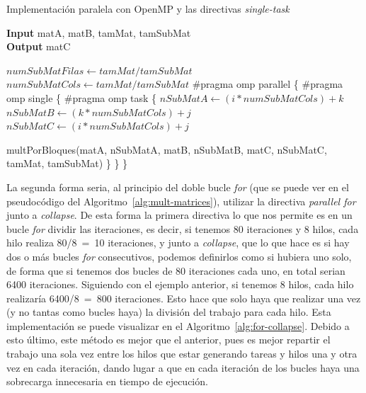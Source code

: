 \documentclass[a4paper,12pt]{article}
\begin{document}
\begin{algorithm} [htbp]
	\caption{Implementación paralela con OpenMP y las directivas {\it single-task}}
    \hspace*{\algorithmicindent} \textbf{Input} matA, matB, tamMat, tamSubMat\\
    \hspace*{\algorithmicindent} \textbf{Output} matC
	\begin{algorithmic}[1]
	    \State $numSubMatFilas \leftarrow tamMat/tamSubMat$
		\State $numSubMatCols \leftarrow tamMat/tamSubMat$
		\State \#pragma omp parallel
		\State \{
		\State \#pragma omp single
        \State \{
	        \State \#pragma omp task 
            \State \{
				\State $nSubMatA \leftarrow (i * numSubMatCols) + k$ 
				\State $nSubMatB \leftarrow  (k * numSubMatCols) + j$
				\State $nSubMatC \leftarrow  (i * numSubMatCols) + j$
				
				\State multPorBloques(matA, nSubMatA, matB, nSubMatB, matC, nSubMatC, tamMat, tamSubMat)
            \EndFor
	        \State \}
        \EndFor
		\EndFor
		\State \}
		\State \}
	\end{algorithmic}
	\label{alg:single-task}
\end{algorithm}

La segunda forma seria, al principio del doble bucle {\it for} (que se puede ver en el pseudocódigo del Algoritmo~\ref{alg:mult-matrices}), utilizar la directiva {\it parallel for} junto a {\it collapse}. De esta forma la primera directiva lo que nos permite es en un bucle {\it for} dividir las iteraciones, es decir, si tenemos 80 iteraciones y 8 hilos, cada hilo realiza 80/8~=~10 iteraciones, y junto a {\it collapse}, que lo que hace es si hay dos o más bucles {\it for} consecutivos, podemos definirlos como si hubiera uno solo, de forma que si tenemos dos bucles de 80 iteraciones cada uno, en total serian 6400 iteraciones. Siguiendo con el ejemplo anterior, si tenemos 8 hilos, cada hilo realizaría 6400/8~=~800 iteraciones. Esto hace que solo haya que realizar una vez (y no tantas como bucles haya) la división del trabajo para cada hilo. Esta implementación se puede visualizar en el  Algoritmo~\ref{alg:for-collapse}. Debido a esto último, este método es mejor que el anterior, pues es mejor repartir el trabajo una sola vez entre los hilos que estar generando tareas y hilos una y otra vez en cada iteración, dando lugar a que en cada iteración de los bucles haya una sobrecarga innecesaria en tiempo de ejecución.
\end{document}
